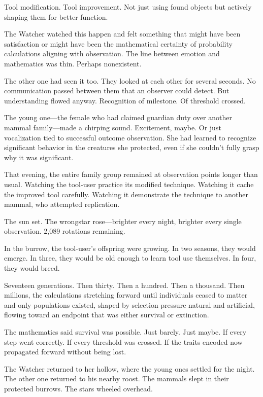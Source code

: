 Tool modification. Tool improvement. Not just using found objects but actively shaping them for better function.

The Watcher watched this happen and felt something that might have been satisfaction or might have been the mathematical certainty of probability calculations aligning with observation. The line between emotion and mathematics was thin. Perhaps nonexistent.

The other one had seen it too. They looked at each other for several seconds. No communication passed between them that an observer could detect. But understanding flowed anyway. Recognition of milestone. Of threshold crossed.

The young one—the female who had claimed guardian duty over another mammal family—made a chirping sound. Excitement, maybe. Or just vocalization tied to successful outcome observation. She had learned to recognize significant behavior in the creatures she protected, even if she couldn't fully grasp why it was significant.

That evening, the entire family group remained at observation points longer than usual. Watching the tool-user practice its modified technique. Watching it cache the improved tool carefully. Watching it demonstrate the technique to another mammal, who attempted replication.

The sun set. The wrongstar rose—brighter every night, brighter every single observation. 2,089 rotations remaining.

In the burrow, the tool-user's offspring were growing. In two seasons, they would emerge. In three, they would be old enough to learn tool use themselves. In four, they would breed.

Seventeen generations. Then thirty. Then a hundred. Then a thousand. Then millions, the calculations stretching forward until individuals ceased to matter and only populations existed, shaped by selection pressure natural and artificial, flowing toward an endpoint that was either survival or extinction.

The mathematics said survival was possible. Just barely. Just maybe. If every step went correctly. If every threshold was crossed. If the traits encoded now propagated forward without being lost.

The Watcher returned to her hollow, where the young ones settled for the night. The other one returned to his nearby roost. The mammals slept in their protected burrows. The stars wheeled overhead.

